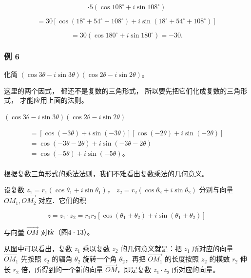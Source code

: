 \[
\cdot 5 (\cos 108 ^ {\circ} + i \sin 108 ^ {\circ})
\]

\[
= 30 \left[ \cos \left(18 ^ {\circ} + 54 ^ {\circ} + 108 ^ {\circ}\right) + i \sin \left(18 ^ {\circ} + 54 ^ {\circ} + 108 ^ {\circ}\right) \right]
\]

\[
= 30 (\cos 180 ^ {\circ} + i \sin 180 ^ {\circ}) = - 30.
\]

\subsubsection{例 6}

化简 \((\cos 3\theta - i\sin 3\theta)(\cos 2\theta - i\sin 2\theta)\)。

 这里的两个因式， 都还不是复数的三角形式，
所以要先把它们化成复数的三角形式， 才能应用上面的法则。

\((\cos 3\theta - i\sin 3\theta)(\cos 2\theta - i\sin 2\theta)\)

\[
\begin{array}{l} = [ \cos (- 3 \theta) + i \sin (- 3 \theta) ] [ \cos (- 2 \theta) + i \sin (- 2 \theta) ] \\ = \cos (- 3 \theta - 2 \theta) + i \sin (- 3 \theta - 2 \theta) \\ = \cos (- 5 \theta) + i \sin (- 5 \theta)\text{。} \\ \end{array}
\]

根据复数三角形式的乘法法则，我们不难看出复数乘法的几何意义。

设复数 \(z_{1} = r_{1}(\cos \theta_{1} + i\sin \theta_{1})\)，
\(z_{2} = r_{2}(\cos \theta_{2} + i\sin \theta_{2})\) 分别与向量
\(\overrightarrow{OM_1},\overrightarrow{OM_2}\) 对应．它们的积

\[
z = z _ {1} \cdot z _ {2} = r _ {1} r _ {2} [ \cos (\theta_ {1} + \theta_ {2}) + i \sin (\theta_ {1} + \theta_ {2}) ]
\]

与向量 \(\overrightarrow{OM}\) 对应（图4·13）。

从图中可以看出，复数 \(z_{1}\) 乘以复数 \(z_{2}\) 的几何意义就是：把
\(z_{1}\) 所对应的向量 \(\overrightarrow{OM_1}\) 先按照 \(z_{2}\) 的辐角
\(\theta_{2}\) 旋转一个角 \(\theta_{2}\)，再把 \(\overrightarrow{OM_1}\)
的长度按照 \(z_{2}\) 的模数 \(r_2\) 伸长 \(r_2\) 倍，所得到的一个新的向量 \(\overrightarrow{OM}\)，即是复数
\(z_{1} \cdot z_{2}\) 所对应的向量。


